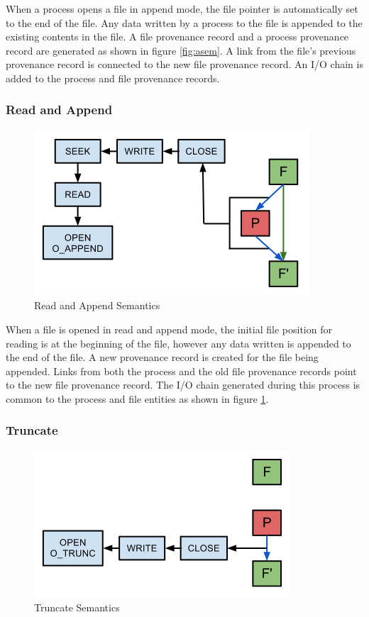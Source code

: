 When a process opens a file in append mode, the file pointer is automatically set to the end of the file. Any data written by a process to the file is appended to the existing contents in the file. A file provenance record and a process provenance record are generated as shown in figure \ref{fig:asem}. A link from the file's previous provenance record is connected to the new file provenance record. An I/O chain is added to the process and file provenance records.


\subsubsection{Read and Append}
\begin{figure}[H]
\centering
\includegraphics[scale=0.5]{res/sem/RandA.png}
\caption{Read and Append Semantics}
\label{fig:randasem}
\end{figure}

When a file is opened in read and append mode, the initial file position for reading is at the beginning of the file, however any data written is appended to the end of the file. A new provenance record is created for the file being appended. Links from both the process and the old file provenance records point to the new file provenance record. The I/O chain generated during this process is common to the process and file entities as shown in figure \ref{fig:randasem}.

\subsubsection{Truncate}
\begin{figure}[H]
\centering
\includegraphics[scale=0.5]{res/sem/T.png}
\caption{Truncate Semantics}
\label{fig:tsem}
\end{figure}

